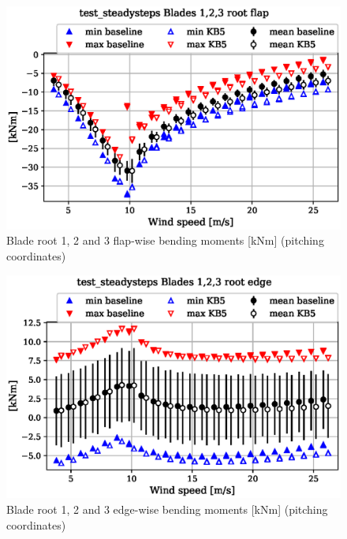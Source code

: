 \begin{figure}[!ht]
\begin{center}
	\includegraphics[width=.85\linewidth]{figures/baseline-vs-KB6/test_steadysteps/blade1-blade1-node-001-momentvec-x_AA0008_AA0008.eps}
\end{center}
\caption{Blade root 1, 2 and 3 flap-wise bending moments [kNm] (pitching coordinates)}
\label{fig:baseline-vs-KB6:test_steadysteps:blade-root-flap}
\end{figure}

\begin{figure}[!ht]
\begin{center}
	\includegraphics[width=.85\linewidth]{figures/baseline-vs-KB6/test_steadysteps/blade1-blade1-node-001-momentvec-y_AA0008_AA0008.eps}
\end{center}
\caption{Blade root 1, 2 and 3 edge-wise bending moments [kNm] (pitching coordinates)}
\label{fig:baseline-vs-KB6:test_steadysteps:blade-root-edge}
\end{figure}

